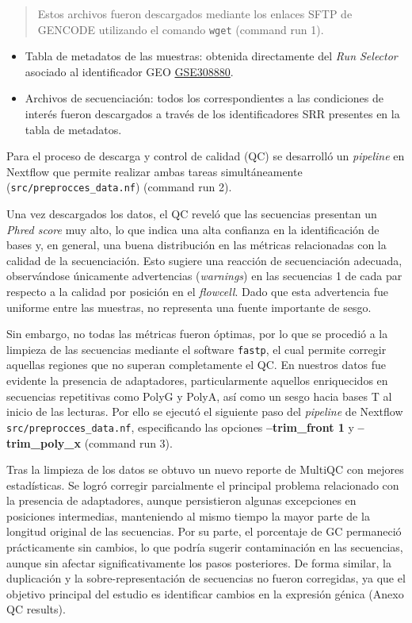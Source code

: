 \documentclass[
  10pt,
]{article}
\providecommand{\tightlist}{%
  \setlength{\itemsep}{0pt}\setlength{\parskip}{0pt}}
\begin{document}
\begin{quote}
Estos archivos fueron descargados mediante los enlaces SFTP de GENCODE
utilizando el comando \texttt{wget} (command run 1).
\end{quote}

\begin{itemize}
\tightlist
\item
  Tabla de metadatos de las muestras: obtenida directamente del
  \emph{Run Selector} asociado al identificador GEO
  \href{https://www.ncbi.nlm.nih.gov/geo/query/acc.cgi?acc=GSE308880}{GSE308880}.
\item
  Archivos de secuenciación: todos los correspondientes a las
  condiciones de interés fueron descargados a través de los
  identificadores SRR presentes en la tabla de metadatos.
\end{itemize}

Para el proceso de descarga y control de calidad (QC) se desarrolló un
\emph{pipeline} en Nextflow que permite realizar ambas tareas
simultáneamente (\texttt{src/preprocces\_data.nf}) (command run 2).

Una vez descargados los datos, el QC reveló que las secuencias presentan
un \emph{Phred score} muy alto, lo que indica una alta confianza en la
identificación de bases y, en general, una buena distribución en las
métricas relacionadas con la calidad de la secuenciación. Esto sugiere
una reacción de secuenciación adecuada, observándose únicamente
advertencias (\emph{warnings}) en las secuencias 1 de cada par respecto
a la calidad por posición en el \emph{flowcell}. Dado que esta
advertencia fue uniforme entre las muestras, no representa una fuente
importante de sesgo.

Sin embargo, no todas las métricas fueron óptimas, por lo que se
procedió a la limpieza de las secuencias mediante el software
\texttt{fastp}, el cual permite corregir aquellas regiones que no
superan completamente el QC. En nuestros datos fue evidente la presencia
de adaptadores, particularmente aquellos enriquecidos en secuencias
repetitivas como PolyG y PolyA, así como un sesgo hacia bases T al
inicio de las lecturas. Por ello se ejecutó el siguiente paso del
\emph{pipeline} de Nextflow \texttt{src/preprocces\_data.nf},
especificando las opciones \textbf{--trim\_front 1} y
\textbf{--trim\_poly\_x} (command run 3).

Tras la limpieza de los datos se obtuvo un nuevo reporte de MultiQC con
mejores estadísticas. Se logró corregir parcialmente el principal
problema relacionado con la presencia de adaptadores, aunque
persistieron algunas excepciones en posiciones intermedias, manteniendo
al mismo tiempo la mayor parte de la longitud original de las
secuencias. Por su parte, el porcentaje de GC permaneció prácticamente
sin cambios, lo que podría sugerir contaminación en las secuencias,
aunque sin afectar significativamente los pasos posteriores. De forma
similar, la duplicación y la sobre-representación de secuencias no
fueron corregidas, ya que el objetivo principal del estudio es
identificar cambios en la expresión génica (Anexo QC results).
\end{document}
